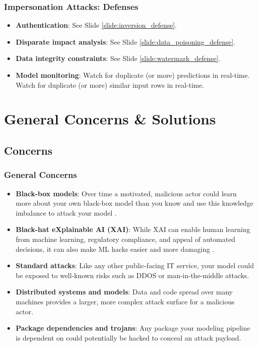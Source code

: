 \documentclass[11pt,
               aspectratio=169,
               hyperref={colorlinks}
               ]{beamer}
\begin{document}
			\begin{frame}
		
				\frametitle{Impersonation Attacks: \textbf{Defenses}}		
			
				\begin{itemize}
					\Large
					\item \textbf{Authentication}: See Slide \ref{slide:inversion_defense}. 
					\item \textbf{Disparate impact analysis}: See Slide \ref{slide:data_poisoning_defense}.
					\item \textbf{Data integrity constraints}: See Slide \ref{slide:watermark_defense}.
					\item \textbf{Model monitoring}: Watch for duplicate (or more) predictions in real-time. Watch for duplicate (or more) similar input rows in real-time.
				\end{itemize}
				
			\end{frame}

	\section{General Concerns \& Solutions}

		\subsection{Concerns}
			\begin{frame}[t, allowframebreaks]	
		
				\frametitle{General Concerns}	
				\footnotesize
				\begin{itemize}
					\item \textbf{Black-box models}: Over time a motivated, malicious actor could learn more about your own black-box model than you know and use this knowledge imbalance to attack your model \cite{papernot2018marauder}.
					\item \textbf{Black-hat eXplainable AI (XAI)}:  While XAI can enable human learning from machine learning, regulatory compliance, and appeal of automated decisions, it can also make ML hacks easier and more damaging \cite{shokri2019privacy}.
					\item \textbf{Standard attacks}: Like any other public-facing IT service, your model could be exposed to well-known risks such as DDOS or man-in-the-middle attacks.  
					\item \textbf{Distributed systems and models}: Data and code spread over many machines provides a larger, more complex attack surface for a malicious actor.
					\item \textbf{Package dependencies and trojans}: Any package your modeling pipeline is dependent on could potentially be hacked to conceal an attack payload.
				\end{itemize}
				\normalsize

			\end{frame}
\end{document}
